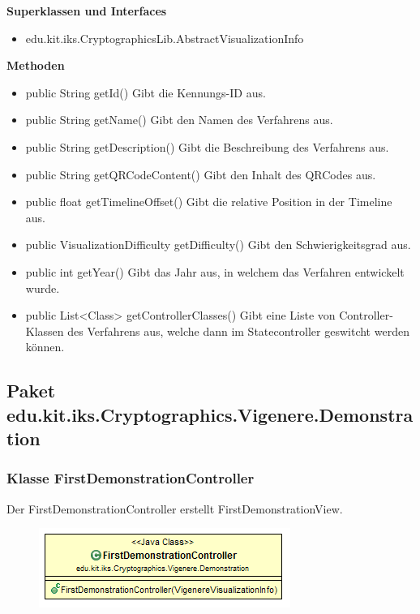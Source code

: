 \documentclass{article}
\begin{document}
      \textbf{Superklassen und Interfaces}
      \begin{itemize}
        \item edu.kit.iks.CryptographicsLib.AbstractVisualizationInfo
      \end{itemize}
      
      \textbf{Methoden}
      \begin{itemize}
        \item public String getId() \newline
        Gibt die Kennungs-ID aus.
        \item public String getName() \newline
        Gibt den Namen des Verfahrens aus.
        \item public String getDescription() \newline
        Gibt die Beschreibung des Verfahrens aus.
        \item public String getQRCodeContent() \newline
        Gibt den Inhalt des QRCodes aus.
        \item public float getTimelineOffset() \newline
        Gibt die relative Position in der Timeline aus.
        \item public VisualizationDifficulty getDifficulty() \newline
        Gibt den Schwierigkeitsgrad aus.
        \item public int getYear() \newline
        Gibt das Jahr aus, in welchem das Verfahren entwickelt wurde.
        \item public List<Class> getControllerClasses() \newline
        Gibt eine Liste von Controller-Klassen des Verfahrens aus, welche dann im Statecontroller geswitcht werden können.
      \end{itemize}

  \subsection{Paket edu.kit.iks.Cryptographics.Vigenere.Demonstration}
    \subsubsection{Klasse FirstDemonstrationController}
      Der FirstDemonstrationController erstellt FirstDemonstrationView.
      \begin{figure}[H]
        \centering
        \includegraphics{resources/edu-kit-iks-Cryptographics-Vigenere-FirstDemonstrationController}
      \end{figure}
\end{document}
